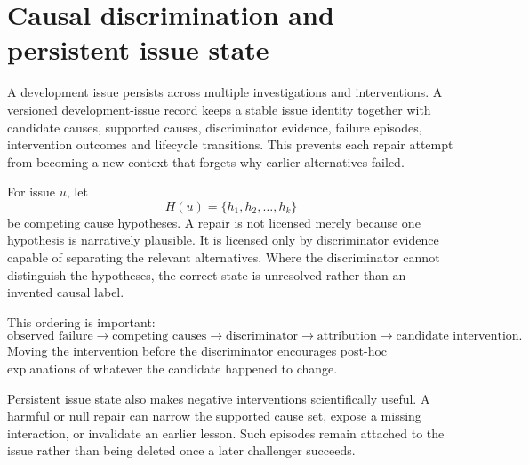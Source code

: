 \section{Causal discrimination and persistent issue state}

A development issue persists across multiple investigations and interventions. A versioned development-issue record keeps a stable issue identity together with candidate causes, supported causes, discriminator evidence, failure episodes, intervention outcomes and lifecycle transitions. This prevents each repair attempt from becoming a new context that forgets why earlier alternatives failed.

For issue $u$, let
\[
H(u)=\{h_1,h_2,\ldots,h_k\}
\]
be competing cause hypotheses. A repair is not licensed merely because one hypothesis is narratively plausible. It is licensed only by discriminator evidence capable of separating the relevant alternatives. Where the discriminator cannot distinguish the hypotheses, the correct state is unresolved rather than an invented causal label.

This ordering is important:
\[
\text{observed failure}
\rightarrow \text{competing causes}
\rightarrow \text{discriminator}
\rightarrow \text{attribution}
\rightarrow \text{candidate intervention}.
\]
Moving the intervention before the discriminator encourages post-hoc explanations of whatever the candidate happened to change.

Persistent issue state also makes negative interventions scientifically useful. A harmful or null repair can narrow the supported cause set, expose a missing interaction, or invalidate an earlier lesson. Such episodes remain attached to the issue rather than being deleted once a later challenger succeeds.
